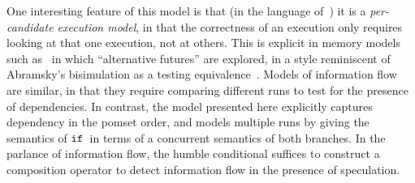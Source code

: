 
One interesting feature of this model is that (in the language
of~\cite{Pichon-Pharabod:2016:CSR:2837614.2837616}) it is a
\emph{per-candidate execution model}, in that the correctness of an
execution only requires looking at that one execution, not at
others. This is explicit in memory models such
as~\cite{Jagadeesan:2010:GOS:2175486.2175503,Kang:2017:PSR:3009837.3009850} in which
``alternative futures'' are explored, in a style reminiscent of
Abramsky's bisimulation as a testing equivalence~\cite{ABRAMSKY1987225}. Models of
information flow are similar, in that they require comparing different
runs to test for the presence of dependencies. In contrast, the model
presented here explicitly captures dependency in the pomset order, and
models multiple runs by giving the semantics of $\texttt{if}\,$ in terms of a
concurrent semantics of both branches.
In the parlance
of information flow, the humble conditional suffices to construct a composition operator to detect information flow  in the presence of speculation.
